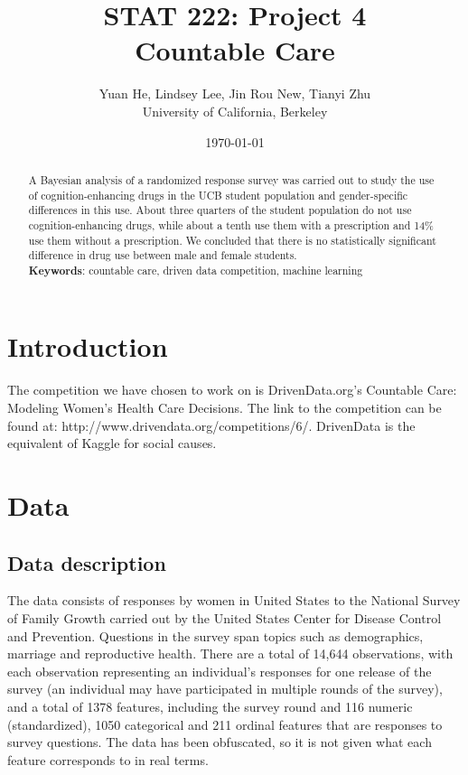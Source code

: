 \documentclass{article}\usepackage[]{graphicx}\usepackage[]{color}
\title{STAT 222: Project 4\\
       Countable Care}
\author{Yuan He, Lindsey Lee, Jin Rou New, Tianyi Zhu\\
        University of California, Berkeley}
\date{\today}
\begin{document}
\maketitle

\begin{abstract}
  A Bayesian analysis of a randomized response survey was carried out to study the use of cognition-enhancing drugs in the UCB student population and gender-specific differences in this use. About three quarters of the student population do not use cognition-enhancing drugs, while about a tenth use them with a prescription and 14\% use them without a prescription. We concluded that there is no statistically significant difference in drug use between male and female students. \\ 
	\hfill\break
	\textbf{Keywords}: countable care, driven data competition, machine learning
\end{abstract}
\clearpage
\section{Introduction}
\label{sec:introduction}

The competition we have chosen to work on is DrivenData.org’s Countable Care: Modeling Women's Health Care Decisions. The link to the competition can be found at: http://www.drivendata.org/competitions/6/. DrivenData is the equivalent of Kaggle for social causes.
\section{Data}
\label{sec:data}

\subsection{Data description}
The data consists of responses by women in United States to the National Survey of Family Growth carried out by the United States Center for Disease Control and Prevention. Questions in the survey span topics such as demographics, marriage and reproductive health. There are a total of 14,644 observations, with each observation representing an individual’s responses for one release of the survey (an individual may have participated in multiple rounds of the survey), and a total of 1378 features, including the survey round and 116 numeric (standardized), 1050 categorical and 211 ordinal features that are responses to survey questions. The data has been obfuscated, so it is not given what each feature corresponds to in real terms.
\end{document}
